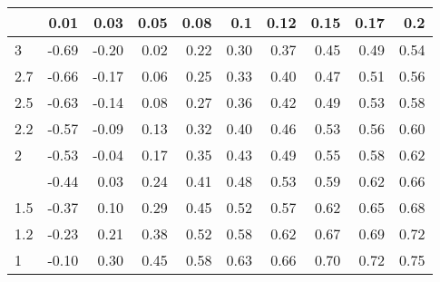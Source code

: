 
\begin{tabular}{lrrrrrrrrr}
\toprule
  & 0.01 & 0.03 & 0.05 & 0.08 & 0.1 & 0.12 & 0.15 & 0.17 & 0.2\\
\midrule
3 & -0.69 & -0.20 & 0.02 & 0.22 & 0.30 & 0.37 & 0.45 & 0.49 & 0.54\\
2.7 & -0.66 & -0.17 & 0.06 & 0.25 & 0.33 & 0.40 & 0.47 & 0.51 & 0.56\\
2.5 & -0.63 & -0.14 & 0.08 & 0.27 & 0.36 & 0.42 & 0.49 & 0.53 & 0.58\\
2.2 & -0.57 & -0.09 & 0.13 & 0.32 & 0.40 & 0.46 & 0.53 & 0.56 & 0.60\\
2 & -0.53 & -0.04 & 0.17 & 0.35 & 0.43 & 0.49 & 0.55 & 0.58 & 0.62\\
\addlinespace
1.7 & -0.44 & 0.03 & 0.24 & 0.41 & 0.48 & 0.53 & 0.59 & 0.62 & 0.66\\
1.5 & -0.37 & 0.10 & 0.29 & 0.45 & 0.52 & 0.57 & 0.62 & 0.65 & 0.68\\
1.2 & -0.23 & 0.21 & 0.38 & 0.52 & 0.58 & 0.62 & 0.67 & 0.69 & 0.72\\
1 & -0.10 & 0.30 & 0.45 & 0.58 & 0.63 & 0.66 & 0.70 & 0.72 & 0.75\\
\bottomrule
\end{tabular}
